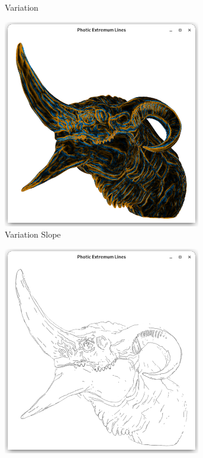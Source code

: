 \documentclass[9pt,fleqn,twoside,twocolumn]{stdglobal}
\begin{document}
\begin{figure}
\begin{subfigure}[b]{0.24\textwidth}
      \caption{Variation}
    \end{subfigure}%
    \hfill%
    \begin{subfigure}[b]{0.24\textwidth}
      \centering
      \includegraphics[width=0.95\textwidth,trim={15px 15 15 50},clip]{images/dragon-head-light-variation-slope.png}
      \caption{Variation Slope}
    \end{subfigure}%
    \hfill
    \begin{subfigure}[b]{0.24\textwidth}
      \centering
      \includegraphics[width=0.95\textwidth,trim={15px 15 15 50},clip]{images/dragon-head-pel-shader.png}

\end{subfigure}
\end{figure}
\end{document}
